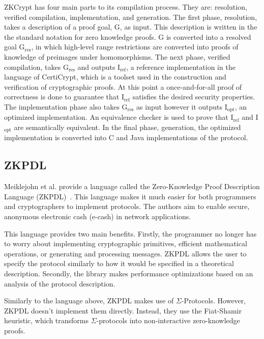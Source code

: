 \documentclass{sig-alternate}
\begin{document}
		ZKCrypt has four main parts to its compilation process. They are: resolution, verified
		compilation, implementation, and generation. The first phase, resolution, takes a
		description of a proof goal, G, as input. This description is written in the the standard
		notation for zero knowledge proofs. G is converted into a resolved goal
		G$_{\textrm{res}}$, in which
		high-level range restrictions are converted into proofs of knowledge of preimages under
		homomorphisms. The next phase, verified compilation, takes G$_{\textrm{res}}$ and 
		outputs I$_{\textrm{ref}}$,
		a reference implementation in the language of CertiCrypt, which is a toolset used in
		the construction and verification of cryptographic proofs. At this point a 
		once-and-for-all proof of correctness is done to guarantee that I$_{\textrm{ref}}$
		satisfies the desired security properties. The implementation phase
		also takes G$_{\textrm{res}}$ as input however it outputs I$_{\textrm{opt}}$, an
		optimized implementation. An equivalence checker is used to prove that I$_{\textrm{ref}}$
		and I$_{\textrm{opt}}$ are semantically equivalent. In the final phase, generation,
		the optimized implementation is converted into C and Java implementations of the
		protocol.
				
	\subsection{ZKPDL}
		Meiklejohn et al. provide a language called the Zero-Knowledge Proof Description
		Language (ZKPDL)~\cite{ZKPDL:2010}. This language makes it much easier for both
		programmers and 	cryptographers to implement protocols. The authors aim to enable
		secure, anonymous electronic cash (e-cash) in network applications.
		
		This language provides two main benefits. Firstly, the programmer no longer 
		has to worry about implementing cryptographic primitives, efficient mathematical
		operations, or generating and processing messages. ZKPDL allows the user to
		specify the protocol similarly to how it would be specified in a theoretical
		description. Secondly, the library makes performance optimizations based on an
		analysis of the protocol description. 
		
		Similarly to the language above, ZKPDL makes use of $\Sigma$-Protocols.
		However, ZKPDL doesn't implement them directly. Instead, they use the 
		Fiat-Shamir heuristic, which transforms $\Sigma$-protocols into non-interactive
		zero-knowledge proofs.
		
\end{document}
